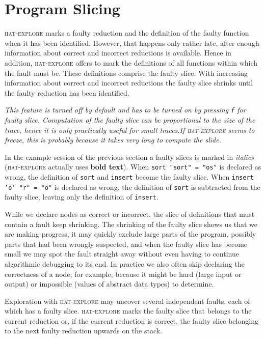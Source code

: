 \documentclass[12pt]{article}
\newcommand{\hatexplore}{\textsc{hat-explore}\xspace}
\newcommand{\quoted}[1]{'#1'}
\begin{document}
\section{Program Slicing}

\hatexplore marks a faulty reduction and the definition of the faulty function when it has been identified. However, that happens only rather late, after enough information about correct and incorrect reductions is available.
Hence in addition, \hatexplore offers to mark the definitions of all functions within which the fault must be. These definitions comprise the faulty slice. With increasing information about correct and incorrect reductions the faulty slice shrinks until the faulty reduction has been identified.

\emph{This feature is turned off by default and has to be turned on by pressing \texttt{f} for faulty slice. Computation of the faulty slice can be proportional to the size of the trace, hence it is only practically useful for small traces.If \hatexplore seems to freeze, this is probably because it takes very long to compute the slide.}

In the example session of the previous section a faulty slices is marked in \emph{italics} (\hatexplore actually uses \textbf{bold text}). When \texttt{sort "sort" = "os"} is declared as wrong, the definition of \texttt{sort} and \texttt{insert} become the faulty slice. When \texttt{insert \quoted{o} "r" = "o"} is declared as wrong, the definition of \texttt{sort} is subtracted from the faulty slice, leaving only the definition of \texttt{insert}.

While we declare nodes as correct or incorrect, the slice of definitions that must contain a fault keep shrinking. The shrinking of the faulty slice shows us that we are making progress, it may quickly exclude large parts of the program, possibly parts that had been wrongly suspected, and when the faulty slice has become small we may spot the fault straight away without even having to continue algorithmic debugging to its end.
In practice we also often skip declaring the correctness of a node; for example, because it might be hard (large input or output) or impossible (values of abstract data types) to determine.

Exploration with \hatexplore may uncover several independent faults, each of which has a faulty slice. \hatexplore marks the faulty slice that belongs to the current reduction or, if the current reduction is correct, the faulty slice belonging to the next faulty reduction upwards on the stack.
\end{document}
